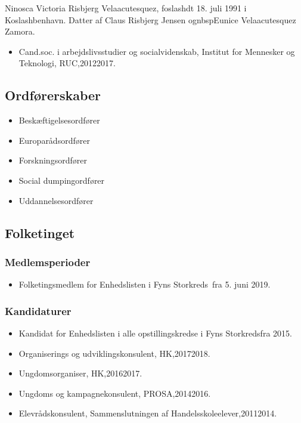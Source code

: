 \documentclass[11pt, a4paper]{awesome-cv}
\begin{document}
\makecvheader[R]
\makelettertitle
\begin{cvletter}
Ninosca Victoria Risbjerg Velaacutesquez, foslashdt 18. juli 1991 i Koslashbenhavn. Datter af Claus Risbjerg Jensen ognbspEunice Velaacutesquez Zamora.

\begin{itemize}
\item Cand.soc. i arbejdslivsstudier og socialvidenskab, Institut for Mennesker og Teknologi, RUC,20122017.
\end{itemize}
\subsection*{Ordførerskaber}
\begin{itemize}
\item Beskæftigelsesordfører
\item Europarådsordfører
\item Forskningsordfører
\item Social dumpingordfører
\item Uddannelsesordfører
\end{itemize}
\subsection*{Folketinget}
\subsubsection*{Medlemsperioder}
\begin{itemize}
\item Folketingsmedlem for Enhedslisten i Fyns Storkreds fra 5. juni 2019.
\end{itemize}
\subsubsection*{Kandidaturer}
\begin{itemize}
\item Kandidat for Enhedslisten i alle opstillingskredse i Fyns Storkredsfra 2015.
\end{itemize}
\begin{itemize}
\item Organiserings og udviklingskonsulent, HK,20172018.
\item Ungdomsorganiser, HK,20162017.
\item Ungdoms og kampagnekonsulent, PROSA,20142016.
\item Elevrådskonsulent, Sammenslutningen af Handelsskoleelever,20112014.
\end{itemize}
\end{cvletter}
\end{document}
